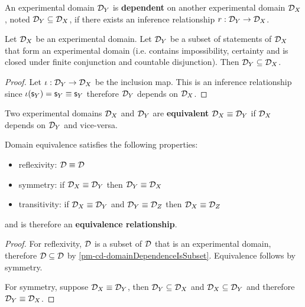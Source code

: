 \begin{mathSection}
	\begin{defn}
		An experimental domain $\mathcal{D}_Y$ is \textbf{dependent} on another experimental domain $\mathcal{D}_X$, noted $\mathcal{D}_Y \subseteq \mathcal{D}_X$, if there exists an inference relationship $r: \mathcal{D}_Y \to \mathcal{D}_X$.
	\end{defn}
	\begin{coro}\label{pm-cd-domainDependenceIsSubset}
		Let $\mathcal{D}_X$ be an experimental domain. Let $\mathcal{D}_Y$ be a subset of statements of $\mathcal{D}_X$ that form an experimental domain (i.e. contains impossibility, certainty and is closed under finite conjunction and countable disjunction). Then $\mathcal{D}_Y \subseteq \mathcal{D}_X$.
	\end{coro}
	\begin{proof}
		Let $\iota : \mathcal{D}_Y \to \mathcal{D}_X$ be the inclusion map. This is an inference relationship since $\iota(\mathsf{s}_Y) = \mathsf{s}_Y \equiv \mathsf{s}_Y$ therefore $\mathcal{D}_Y$ depends on $\mathcal{D}_X$.
	\end{proof}
	\begin{defn}
		Two experimental domains $\mathcal{D}_X$ and $\mathcal{D}_Y$ are \textbf{equivalent} $\mathcal{D}_X \equiv \mathcal{D}_Y$ if $\mathcal{D}_X$ depends on $\mathcal{D}_Y$ and vice-versa.
	\end{defn}
	\begin{coro}
		Domain equivalence satisfies the following properties:
		\begin{itemize}
			\item reflexivity: $\mathcal{D} \equiv \mathcal{D}$
			\item symmetry: if $\mathcal{D}_X \equiv \mathcal{D}_Y$ then $\mathcal{D}_Y \equiv \mathcal{D}_X$
			\item transitivity: if $\mathcal{D}_X \equiv \mathcal{D}_Y$ and $\mathcal{D}_Y \equiv \mathcal{D}_Z$ then $\mathcal{D}_X \equiv \mathcal{D}_Z$
		\end{itemize}
		and is therefore an \textbf{equivalence relationship}.
	\end{coro}
	\begin{proof}
		For reflexivity, $\mathcal{D}$ is a subset of $\mathcal{D}$ that is an experimental domain, therefore $\mathcal{D} \subseteq \mathcal{D}$ by \ref{pm-cd-domainDependenceIsSubset}. Equivalence follows by symmetry.
		
		For symmetry, suppose $\mathcal{D}_X \equiv \mathcal{D}_Y$, then $\mathcal{D}_Y \subseteq \mathcal{D}_X$ and $\mathcal{D}_X \subseteq \mathcal{D}_Y$ and therefore $\mathcal{D}_Y \equiv \mathcal{D}_X$.
		

\end{proof}
\end{mathSection}
